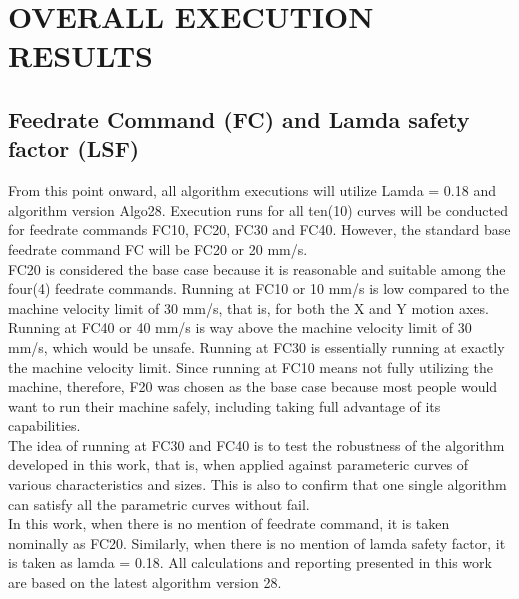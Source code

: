 \clearpage
\pagebreak

\section{OVERALL EXECUTION RESULTS} \label{sec-OVERALL EXECUTION RESULTS}

\subsection{Feedrate Command (FC) and Lamda safety factor (LSF)}
\label{chap4-Feedrate Command FC and Lamda Safety Factor LSF}

From this point onward, all algorithm executions will utilize Lamda = 0.18 and algorithm version Algo28. Execution runs for all ten(10) curves will be conducted for feedrate commands FC10, FC20, FC30 and FC40. However, the standard base feedrate command FC will be FC20 or 20 mm/s.\\

FC20 is considered the base case because it is reasonable and suitable among the four(4) feedrate commands. Running at FC10 or 10 mm/s is low compared to the machine velocity limit of 30 mm/s, that is, for both the X and Y motion axes. Running at FC40 or 40 mm/s is way above the machine velocity limit of 30 mm/s, which would be unsafe. Running at FC30 is essentially running at exactly the machine velocity limit. Since running at FC10 means not fully utilizing the machine, therefore, F20 was chosen as the base case because most people would want to run their machine safely, including taking full advantage of its capabilities. \\  

The idea of running at FC30 and FC40 is to test the robustness of the algorithm developed in this work, that is, when applied against parameteric curves of various characteristics and sizes. This is also to confirm that one single algorithm can satisfy all the parametric curves without fail.\\ 

In this work, when there is no mention of feedrate command, it is taken nominally as FC20. Similarly, when there is no mention of lamda safety factor, it is taken as lamda = 0.18. All calculations and reporting presented in this work are based on the latest algorithm version 28.


